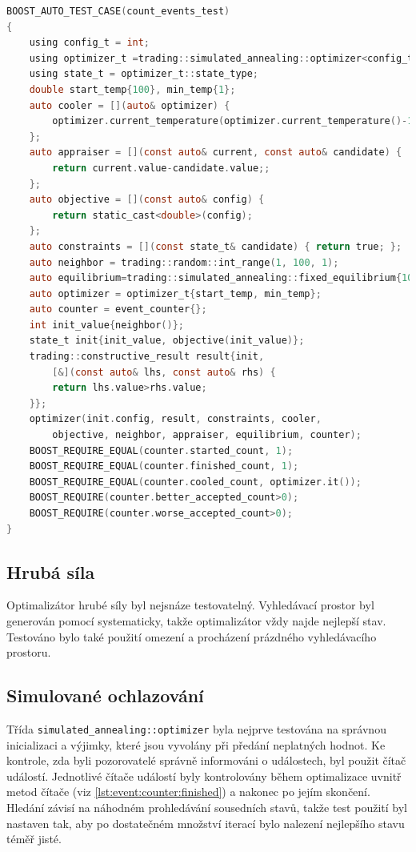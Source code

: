 \begin{lstlisting}[caption={~Testování optimalizátoru pomocí pozorovatele},label={lst:test:event:counter},captionpos=t,abovecaptionskip=-\medskipamount,belowcaptionskip=\medskipamount,language=C]
BOOST_AUTO_TEST_CASE(count_events_test)
{
    using config_t = int;
    using optimizer_t =trading::simulated_annealing::optimizer<config_t>;
    using state_t = optimizer_t::state_type;
    double start_temp{100}, min_temp{1};
    auto cooler = [](auto& optimizer) {
        optimizer.current_temperature(optimizer.current_temperature()-1);
    };
    auto appraiser = [](const auto& current, const auto& candidate) {
        return current.value-candidate.value;;
    };
    auto objective = [](const auto& config) {
        return static_cast<double>(config);
    };
    auto constraints = [](const state_t& candidate) { return true; };
    auto neighbor = trading::random::int_range(1, 100, 1);
    auto equilibrium=trading::simulated_annealing::fixed_equilibrium{10};
    auto optimizer = optimizer_t{start_temp, min_temp};
    auto counter = event_counter{};
    int init_value{neighbor()};
    state_t init{init_value, objective(init_value)};
    trading::constructive_result result{init,
        [&](const auto& lhs, const auto& rhs) {
        return lhs.value>rhs.value;
    }};
    optimizer(init.config, result, constraints, cooler,
        objective, neighbor, appraiser, equilibrium, counter);
    BOOST_REQUIRE_EQUAL(counter.started_count, 1);
    BOOST_REQUIRE_EQUAL(counter.finished_count, 1);
    BOOST_REQUIRE_EQUAL(counter.cooled_count, optimizer.it());
    BOOST_REQUIRE(counter.better_accepted_count>0);
    BOOST_REQUIRE(counter.worse_accepted_count>0);
}
\end{lstlisting}

\subsection{Hrubá síla}
Optimalizátor hrubé síly byl nejsnáze testovatelný.
Vyhledávací prostor byl generován pomocí systematicky, takže optimalizátor vždy najde nejlepší stav.
Testováno bylo také použití omezení a procházení prázdného vyhledávacího prostoru.

\subsection{Simulované ochlazování}
Třída \texttt{simulated\_annealing::optimizer} byla nejprve testována na správnou inicializaci a výjimky, které jsou vyvolány při předání neplatných hodnot.
Ke kontrole, zda byli pozorovatelé správně informováni o událostech, byl použit čítač událostí.
Jednotlivé čítače událostí byly kontrolovány během optimalizace uvnitř metod čítače (viz \ref{lst:event:counter:finished}) a nakonec po jejím skončení.
Hledání závisí na náhodném prohledávání sousedních stavů, takže test použití byl nastaven tak, aby po dostatečném množství iterací bylo nalezení nejlepšího stavu téměř jisté.


